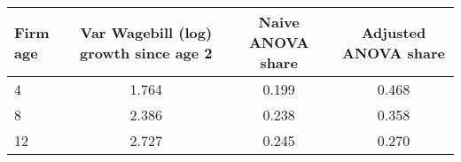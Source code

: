 \begin{tabular}{lccc}
Firm age & Var Wagebill (log) growth since age 2 & Naive ANOVA share & Adjusted ANOVA share \\
\hline
4 &     1.764 &  0.199 &  0.468 \\
8 &     2.386 &  0.238 &  0.358 \\
12 &     2.727 &  0.245 &  0.270 \\
\end{tabular}
